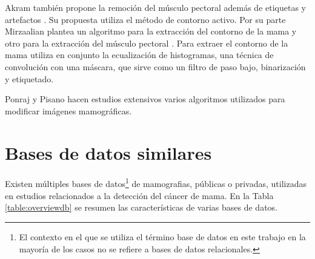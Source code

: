 Akram también propone la remoción del músculo pectoral además de etiquetas y
artefactos \cite{akram2013preprocessing}. Su propuesta utiliza el método de
contorno activo. Por su parte Mirzaalian plantea un algoritmo para la
extracción del contorno de la mama y otro para la extracción del músculo
pectoral \cite{mirzaalian2007pre}. Para extraer el contorno de la mama utiliza
en conjunto la ecualización de histogramas, una técnica de convolución con una
máscara, que sirve como un filtro de paso bajo, binarización y etiquetado.


Ponraj \cite{ponraj2011survey} y Pisano \cite{pisano2000image} hacen estudios
extensivos varios algoritmos utilizados para modificar imágenes mamográficas.

\section{Bases de datos similares}

Existen múltiples bases de datos\footnote{El contexto en el que se utiliza el
término base de datos en este trabajo en la mayoría de los casos no se refiere
a bases de datos relacionales.} de mamografias, públicas o privadas, utilizadas
en estudios relacionados a la detección del cáncer de mama. En la Tabla
\ref{table:overviewdb} se resumen las características de varias bases de datos.

